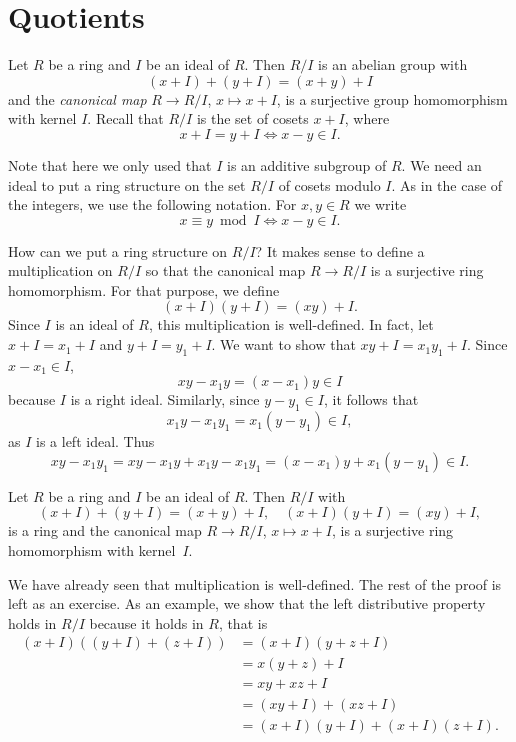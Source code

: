 \section{Quotients}
\lecture\label{lec:Quotients}

Let $R$ be a ring and $I$ be an ideal of $R$. 
Then $R/I$ is an abelian group
with 
\[
(x+I)+(y+I)=(x+y)+I
\]
and the 
\emph{canonical map} 
$R\to R/I$, $x\mapsto x+I$,
is a surjective group homomorphism with kernel $I$. Recall that 
$R/I$ is the set of cosets $x+I$, where 
\[
x+I=y+I\Longleftrightarrow x-y\in I.
\]

Note that here we only used
that $I$ is an additive subgroup of $R$. We need an ideal to put a ring structure
on the set $R/I$ of cosets modulo $I$. As in the case of the integers, 
we use the following notation. For $x,y\in R$ 
we write 
\[
x\equiv y\bmod I\Longleftrightarrow x-y\in I.
\]

How can we put a ring structure on $R/I$? It makes sense
to define a multiplication on $R/I$ so that
the canonical map $R\to R/I$ is a surjective ring homomorphism. For that purpose, 
we define 
\[
(x+I)(y+I)=(xy)+I.
\]
Since $I$ is an ideal of $R$, this multiplication is well-defined. In fact, let 
$x+I=x_1+I$ and $y+I=y_1+I$. We want to show that
$xy+I=x_1y_1+I$. Since $x-x_1\in I$, 
\[
xy-x_1y=(x-x_1)y\in I
\]
because $I$ is a right ideal. Similarly, since $y-y_1\in I$, it follows that 
\[
x_1y-x_1y_1=x_1(y-y_1)\in I,
\]
as $I$ is a left ideal. Thus
\[
xy-x_1y_1=xy-x_1y+x_1y-x_1y_1=(x-x_1)y+x_1(y-y_1)\in I.
\]

\begin{theorem}
\label{thm:quotient_ring}
	Let $R$ be a ring and $I$ be an ideal of $R$. Then
	$R/I$ with 
	\[
	(x+I)+(y+I)=(x+y)+I,\quad
	(x+I)(y+I)=(xy)+I,
	\]
	is a ring and the canonical map $R\to R/I$, $x\mapsto x+I$, 
	is a surjective ring homomorphism with kernel~$I$. 
\end{theorem}

We have already seen that multiplication is well-defined. 
The rest of the proof is left as an exercise. As an example, we show that 
the left distributive property holds
in $R/I$ because it holds in $R$, that is 
\begin{align*}
    (x+I)\left((y+I)+(z+I)\right) &= (x+I)(y+z+I)\\
    &=x(y+z)+I\\
    &=xy+xz+I\\
    &=(xy+I)+(xz+I)\\
    &=(x+I)(y+I)+(x+I)(z+I).
\end{align*}

